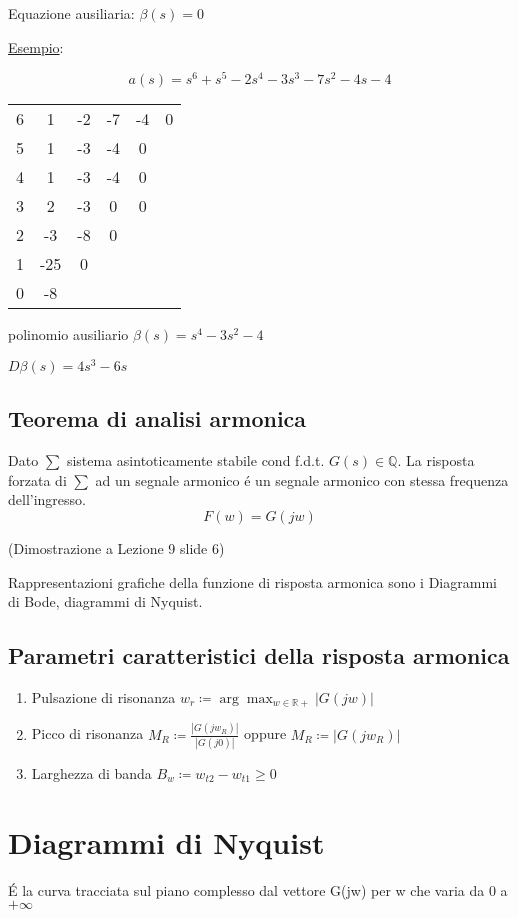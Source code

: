 \documentclass{article}
\begin{document}
Equazione ausiliaria: $ \beta(s) = 0$

\underline{Esempio}:

\begin{minipage}{0.45\textwidth}
    \[ a(s) = s^6 + s^5 - 2s^4 -3s^3 - 7s^2 -4s -4 \]
    \begin{center}
        \begin{tabular}{c|c c c c c}
            6 & 1 & -2 & -7 & -4 & 0\\
            5 & 1 & -3 & -4 & 0\\
            4 & 1 & -3 & -4 & 0\\
            \hline
            3 & 2 & -3 & 0 & 0\\
            2 & -3 & -8 & 0\\
            1 & -25 & 0\\
            0 & -8
        \end{tabular}
    \end{center}
\end{minipage}
\begin{minipage}{0.5\textwidth}
    polinomio ausiliario $\beta(s) = s^4 -3s^2 -4$

    $D\beta(s) = 4s^3 - 6s$
\end{minipage}

\subsection{Teorema di analisi armonica}
Dato $\sum$ sistema asintoticamente stabile cond f.d.t. $G(s) \in \mathbb{Q}$. La risposta forzata di $\sum$ ad un segnale armonico \'e un segnale armonico con stessa frequenza dell'ingresso.
\[ F(w) = G(jw) \]

(Dimostrazione a Lezione 9 slide 6)

Rappresentazioni grafiche della funzione di risposta armonica sono i Diagrammi di Bode, diagrammi di Nyquist.

\subsection{Parametri caratteristici della risposta armonica}
\begin{enumerate}
    \item Pulsazione di risonanza $w_r \coloneqq \arg\max_{w\in\mathbb{R+}}|G(jw)|$
    \item Picco di risonanza $M_R \coloneqq \frac{|G(jw_R)|}{|G(j0)|}$ oppure $M_R \coloneqq |G(jw_R)|$
    \item Larghezza di banda $B_w \coloneqq w_{t2} - w_{t1} \ge 0$
\end{enumerate}

\section{Diagrammi di Nyquist}
\'E la curva tracciata sul piano complesso dal vettore G(jw) per w che varia da 0 a $+\infty$
\end{document}
